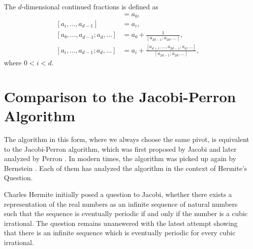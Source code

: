 The $d$-dimensional continued fractions is defined as
\begin{align*}
  [a₀, \dots, a_{d-1}] & = a₀, \\
  [a_i, \dots, a_{d-1}] & = a_i, \\
  [a₀, \dots, a_{d-1}; a_d, \dots]
  & = a₀ + \frac{1}{[a_{2d-1}; a_{2d}, \dots]}, \\
  [a_i, \dots, a_{d-1}; a_d, \dots]
  & = a_i + \frac{[a_{d+i}, \dots, a_{2d - 1}; a_d, \dots]}{[a_{2d-1}; a_{2d}, \dots]},
\end{align*}
where $0 < i < d$.

\section{Comparison to the Jacobi-Perron Algorithm}

The algorithm in this form, where we always choose the same pivot,
is equivalent to the Jacobi-Perron algorithm, which was first proposed
by Jacobi \cite{Jacobi68} and later analyzed by Perron \cite{Perron07}.
In modern times, the algorithm was picked up again by Bernstein \cite{Bernstein06}.
Each of them has analyzed the algorithm in the context of Hermite's Question.

Charles Hermite initially posed a question to Jacobi, whether there exists a
representation of the real numbers as an infinite sequence of natural numbers
such that the sequence is eventually periodic if and only if the number is a
cubic irrational. The question remains unanswered with the latest attempt
\cite{Murru15} showing that there is an infinite sequence which is eventually
periodic for every cubic irrational.
